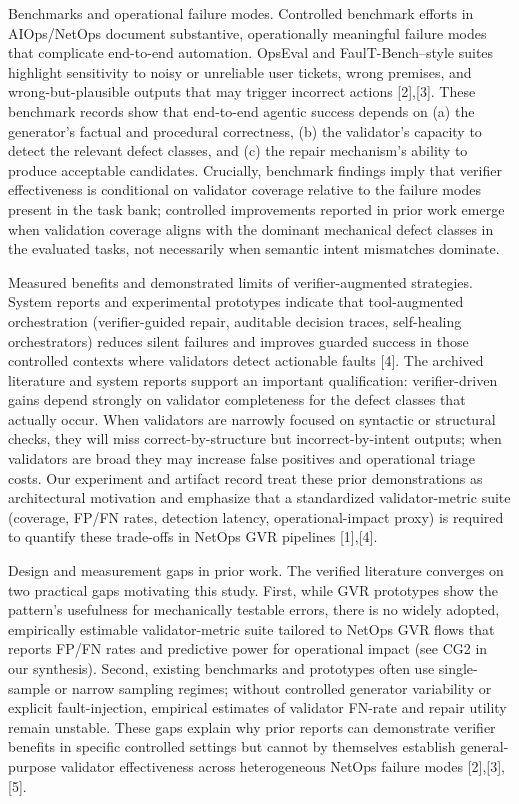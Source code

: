 \documentclass[conference]{IEEEtran}
\begin{document}
Benchmarks and operational failure modes. Controlled benchmark efforts in AIOps/NetOps document substantive, operationally meaningful failure modes that complicate end-to-end automation. OpsEval and FaulT-Bench--style suites highlight sensitivity to noisy or unreliable user tickets, wrong premises, and wrong-but-plausible outputs that may trigger incorrect actions [2],[3]. These benchmark records show that end-to-end agentic success depends on (a) the generator's factual and procedural correctness, (b) the validator's capacity to detect the relevant defect classes, and (c) the repair mechanism's ability to produce acceptable candidates. Crucially, benchmark findings imply that verifier effectiveness is conditional on validator coverage relative to the failure modes present in the task bank; controlled improvements reported in prior work emerge when validation coverage aligns with the dominant mechanical defect classes in the evaluated tasks, not necessarily when semantic intent mismatches dominate.

Measured benefits and demonstrated limits of verifier-augmented strategies. System reports and experimental prototypes indicate that tool-augmented orchestration (verifier-guided repair, auditable decision traces, self-healing orchestrators) reduces silent failures and improves guarded success in those controlled contexts where validators detect actionable faults [4]. The archived literature and system reports support an important qualification: verifier-driven gains depend strongly on validator completeness for the defect classes that actually occur. When validators are narrowly focused on syntactic or structural checks, they will miss correct-by-structure but incorrect-by-intent outputs; when validators are broad they may increase false positives and operational triage costs. Our experiment and artifact record treat these prior demonstrations as architectural motivation and emphasize that a standardized validator-metric suite (coverage, FP/FN rates, detection latency, operational-impact proxy) is required to quantify these trade-offs in NetOps GVR pipelines [1],[4].

Design and measurement gaps in prior work. The verified literature converges on two practical gaps motivating this study. First, while GVR prototypes show the pattern's usefulness for mechanically testable errors, there is no widely adopted, empirically estimable validator-metric suite tailored to NetOps GVR flows that reports FP/FN rates and predictive power for operational impact (see CG2 in our synthesis). Second, existing benchmarks and prototypes often use single-sample or narrow sampling regimes; without controlled generator variability or explicit fault-injection, empirical estimates of validator FN-rate and repair utility remain unstable. These gaps explain why prior reports can demonstrate verifier benefits in specific controlled settings but cannot by themselves establish general-purpose validator effectiveness across heterogeneous NetOps failure modes [2],[3],[5].
\end{document}
